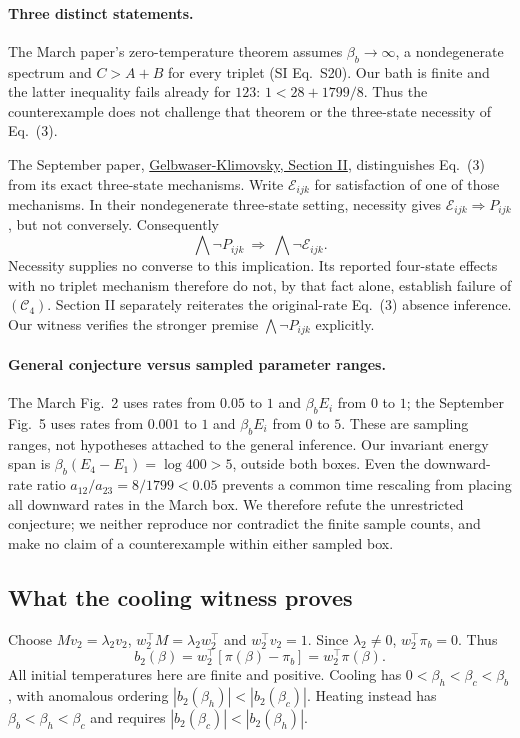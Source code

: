 \documentclass[11pt]{article}
\begin{document}
\paragraph{Three distinct statements.}
The March paper's zero-temperature theorem assumes $\beta_b\to\infty$, a nondegenerate spectrum and $C>A+B$ for every triplet (SI Eq.~S20). Our bath is finite and the latter inequality fails already for $123$: $1<28+1799/8$. Thus the counterexample does not challenge that theorem or the three-state necessity of Eq.~(3).

The September paper, \href{https://arxiv.org/html/2609.09988v1#S2}{Gelbwaser-Klimovsky, Section II}, distinguishes Eq.~(3) from its exact three-state mechanisms. Write $\mathcal E_{ijk}$ for satisfaction of one of those mechanisms. In their nondegenerate three-state setting, necessity gives $\mathcal E_{ijk}\Rightarrow P_{ijk}$, but not conversely. Consequently
\[
\bigwedge\neg P_{ijk}\ \Longrightarrow\ \bigwedge\neg\mathcal E_{ijk}.
\]
Necessity supplies no converse to this implication. Its reported four-state effects with no triplet mechanism therefore do not, by that fact alone, establish failure of $(\mathcal C_4)$. Section II separately reiterates the original-rate Eq.~(3) absence inference. Our witness verifies the stronger premise $\bigwedge\neg P_{ijk}$ explicitly.

\paragraph{General conjecture versus sampled parameter ranges.}
The March Fig.~2 uses rates from $0.05$ to $1$ and $\beta_bE_i$ from $0$ to $1$; the September Fig.~5 uses rates from $0.001$ to $1$ and $\beta_bE_i$ from $0$ to $5$. These are sampling ranges, not hypotheses attached to the general inference. Our invariant energy span is $\beta_b(E_4-E_1)=\log400>5$, outside both boxes. Even the downward-rate ratio $a_{12}/a_{23}=8/1799<0.05$ prevents a common time rescaling from placing all downward rates in the March box. We therefore refute the unrestricted conjecture; we neither reproduce nor contradict the finite sample counts, and make no claim of a counterexample within either sampled box.

\subsection{What the cooling witness proves}\label{sec:cooling}
Choose $Mv_2=\lambda_2v_2$, $w_2^\top M=\lambda_2w_2^\top$ and $w_2^\top v_2=1$. Since $\lambda_2\ne0$, $w_2^\top\pi_b=0$. Thus
\[
b_2(\beta)=w_2^\top[\pi(\beta)-\pi_b]=w_2^\top\pi(\beta).
\]
All initial temperatures here are finite and positive. Cooling has $0<\beta_h<\beta_c<\beta_b$, with anomalous ordering $|b_2(\beta_h)|<|b_2(\beta_c)|$. Heating instead has $\beta_b<\beta_h<\beta_c$ and requires $|b_2(\beta_c)|<|b_2(\beta_h)|$.
\end{document}
